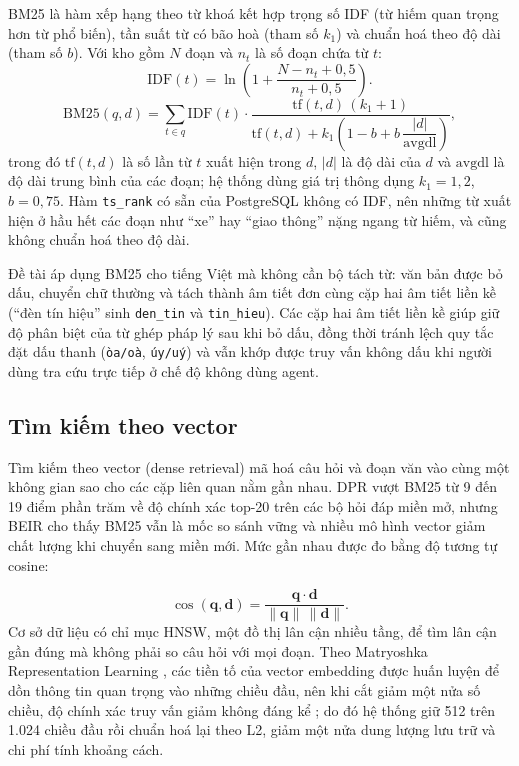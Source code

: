 BM25 \cite{robertson2009bm25} là hàm xếp hạng theo từ khoá kết hợp trọng số IDF (từ hiếm quan trọng hơn từ phổ biến), tần suất từ có bão hoà (tham số $k_1$) và chuẩn hoá theo độ dài (tham số $b$). Với kho gồm $N$ đoạn và $n_t$ là số đoạn chứa từ $t$:
\begin{equation}
\label{eq:c2_idf}
\mathrm{IDF}(t) = \ln\left(1 + \frac{N - n_t + 0{,}5}{n_t + 0{,}5}\right).
\end{equation}
\begin{equation}
\label{eq:c2_bm25}
\mathrm{BM25}(q, d) = \sum_{t \in q} \mathrm{IDF}(t) \cdot \frac{\mathrm{tf}(t, d)\,(k_1 + 1)}{\mathrm{tf}(t, d) + k_1 \left(1 - b + b\,\dfrac{|d|}{\mathrm{avgdl}}\right)},
\end{equation}
trong đó $\mathrm{tf}(t, d)$ là số lần từ $t$ xuất hiện trong $d$, $|d|$ là độ dài của $d$ và $\mathrm{avgdl}$ là độ dài trung bình của các đoạn; hệ thống dùng giá trị thông dụng $k_1 = 1{,}2$, $b = 0{,}75$. Hàm \texttt{ts\_rank} có sẵn của PostgreSQL không có IDF, nên những từ xuất hiện ở hầu hết các đoạn như ``xe'' hay ``giao thông'' nặng ngang từ hiếm, và cũng không chuẩn hoá theo độ dài.

Đề tài áp dụng BM25 cho tiếng Việt mà không cần bộ tách từ: văn bản được bỏ dấu, chuyển chữ thường và tách thành âm tiết đơn cùng cặp hai âm tiết liền kề (``đèn tín hiệu'' sinh \texttt{den\_tin} và \texttt{tin\_hieu}). Các cặp hai âm tiết liền kề giúp giữ độ phân biệt của từ ghép pháp lý sau khi bỏ dấu, đồng thời tránh lệch quy tắc đặt dấu thanh (\texttt{òa/oà}, \texttt{úy/uý}) và vẫn khớp được truy vấn không dấu khi người dùng tra cứu trực tiếp ở chế độ không dùng agent.

\subsection{Tìm kiếm theo vector}
\label{subsec:c2_dense}

Tìm kiếm theo vector (dense retrieval) mã hoá câu hỏi và đoạn văn vào cùng một không gian sao cho các cặp liên quan nằm gần nhau. DPR \cite{karpukhin2020dpr} vượt BM25 từ 9 đến 19 điểm phần trăm về độ chính xác top-20 trên các bộ hỏi đáp miền mở, nhưng BEIR \cite{thakur2021beir} cho thấy BM25 vẫn là mốc so sánh vững và nhiều mô hình vector giảm chất lượng khi chuyển sang miền mới. Mức gần nhau được đo bằng độ tương tự cosine:

\begin{equation}
\label{eq:c2_cosine}
\cos(\mathbf{q}, \mathbf{d}) = \frac{\mathbf{q} \cdot \mathbf{d}}{\lVert \mathbf{q} \rVert \, \lVert \mathbf{d} \rVert}.
\end{equation}
Cơ sở dữ liệu có chỉ mục HNSW, một đồ thị lân cận nhiều tầng, để tìm lân cận gần đúng mà không phải so câu hỏi với mọi đoạn. Theo Matryoshka Representation Learning \cite{kusupati2022mrl}, các tiền tố của vector embedding được huấn luyện để dồn thông tin quan trọng vào những chiều đầu, nên khi cắt giảm một nửa số chiều, độ chính xác truy vấn giảm không đáng kể \cite{kusupati2022mrl,li20242dmse,zhang2025qwen3}; do đó hệ thống giữ 512 trên 1.024 chiều đầu rồi chuẩn hoá lại theo L2, giảm một nửa dung lượng lưu trữ và chi phí tính khoảng cách.

